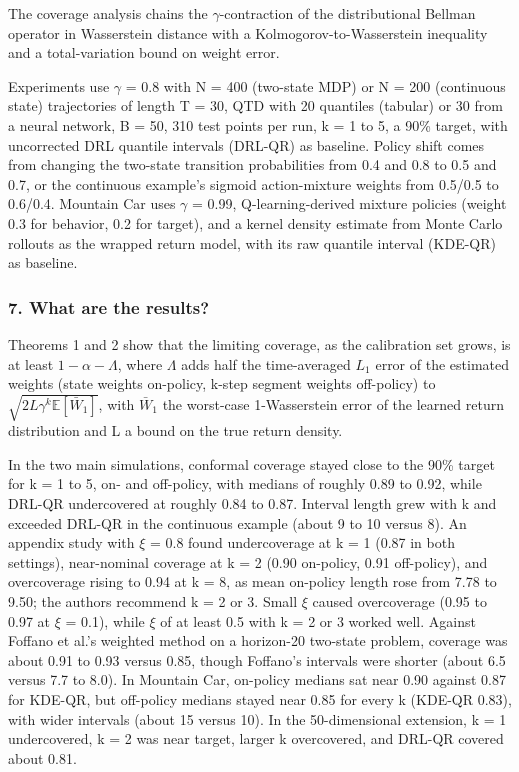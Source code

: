 \documentclass[11pt]{article}
\newcommand{\question}[1]{\subsubsection*{#1}}
\begin{document}
The coverage analysis chains the \ensuremath{\gamma}-contraction of the distributional Bellman operator in Wasserstein distance with a Kolmogorov-to-Wasserstein inequality and a total-variation bound on weight error.

Experiments use \ensuremath{\gamma} = 0.8 with N = 400 (two-state MDP) or N = 200 (continuous state) trajectories of length T = 30, QTD with 20 quantiles (tabular) or 30 from a neural network, B = 50, 310 test points per run, k = 1 to 5, a 90\% target, with uncorrected DRL quantile intervals (DRL-QR) as baseline. Policy shift comes from changing the two-state transition probabilities from 0.4 and 0.8 to 0.5 and 0.7, or the continuous example's sigmoid action-mixture weights from 0.5/0.5 to 0.6/0.4. Mountain Car uses \ensuremath{\gamma} = 0.99, Q-learning-derived mixture policies (weight 0.3 for behavior, 0.2 for target), and a kernel density estimate from Monte Carlo rollouts as the wrapped return model, with its raw quantile interval (KDE-QR) as baseline.

\question{7. What are the results?}

Theorems 1 and 2 show that the limiting coverage, as the calibration set grows, is at least $1 - \alpha - \Lambda$, where \ensuremath{\Lambda} adds half the time-averaged $L_1$ error of the estimated weights (state weights on-policy, k-step segment weights off-policy) to $\sqrt{2L\gamma^k \mathbb{E}[\bar{W}_1]}$, with $\bar{W}_1$ the worst-case 1-Wasserstein error of the learned return distribution and L a bound on the true return density.

In the two main simulations, conformal coverage stayed close to the 90\% target for k = 1 to 5, on- and off-policy, with medians of roughly 0.89 to 0.92, while DRL-QR undercovered at roughly 0.84 to 0.87. Interval length grew with k and exceeded DRL-QR in the continuous example (about 9 to 10 versus 8). An appendix study with \ensuremath{\xi} = 0.8 found undercoverage at k = 1 (0.87 in both settings), near-nominal coverage at k = 2 (0.90 on-policy, 0.91 off-policy), and overcoverage rising to 0.94 at k = 8, as mean on-policy length rose from 7.78 to 9.50; the authors recommend k = 2 or 3. Small \ensuremath{\xi} caused overcoverage (0.95 to 0.97 at \ensuremath{\xi} = 0.1), while \ensuremath{\xi} of at least 0.5 with k = 2 or 3 worked well. Against Foffano et al.'s weighted method on a horizon-20 two-state problem, coverage was about 0.91 to 0.93 versus 0.85, though Foffano's intervals were shorter (about 6.5 versus 7.7 to 8.0). In Mountain Car, on-policy medians sat near 0.90 against 0.87 for KDE-QR, but off-policy medians stayed near 0.85 for every k (KDE-QR 0.83), with wider intervals (about 15 versus 10). In the 50-dimensional extension, k = 1 undercovered, k = 2 was near target, larger k overcovered, and DRL-QR covered about 0.81.
\end{document}
